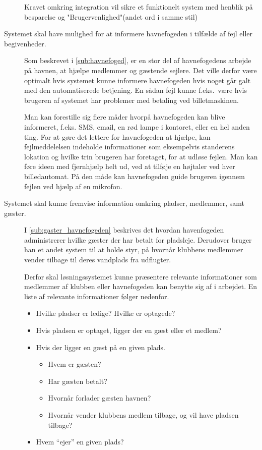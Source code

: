 \begin{description}
Kravet omkring integration vil sikre et funktionelt system med henblik på besparelse og "Brugervenlighed"(andet ord i samme stil)

  \item[Systemet skal have mulighed for at informere havnefogeden i tilfælde af fejl eller begivenheder.]

  Som beskrevet i \cref{sub:havnefoged}, er en stor del af havnefogedens arbejde på havnen, at hjælpe medlemmer og gæstende sejlere. Det ville derfor være optimalt hvis systemet kunne informere havnefogeden hvis noget går galt med den automatiserede betjening. En sådan fejl kunne f.eks.\ være hvis brugeren af systemet har problemer med betaling ved billetmaskinen.

  Man kan forestille sig flere måder hvorpå havnefogeden kan blive informeret, f.eks. SMS, email, en rød lampe i kontoret, eller en hel anden ting. For at gøre det lettere for havnefogeden at hjælpe, kan fejlmeddelelsen indeholde informationer som eksempelvis standerens lokation og hvilke trin brugeren har foretaget, for at udløse fejlen. Man kan føre ideen med fjernhjælp helt ud, ved at tilføje en højtaler ved hver billedautomat. På den måde kan havnefogeden guide brugeren igennem fejlen ved hjælp af en mikrofon.


  \item[Systemet skal kunne fremvise information omkring pladser, medlemmer, samt gæster.]

  I \cref{sub:gaster_havnefogeden} beskrives det hvordan havenfogeden administrerer hvilke gæster der har betalt for pladsleje. Derudover bruger han et andet system til at holde styr, på hvornår klubbens medlemmer vender tilbage til deres vandplads fra udflugter.

  Derfor skal løsningssystemet kunne præsentere relevante informationer som medlemmer af klubben eller havnefogeden kan benytte sig af i arbejdet. En liste af relevante informationer følger nedenfor.





  \begin{itemize}
  \item Hvilke pladser er ledige? Hvilke er optagede?
  \item Hvis pladsen er optaget, ligger der en gæst eller et medlem?
  \item Hvis der ligger en gæst på en given plads.
    \begin{itemize}
      \item Hvem er gæsten?
      \item Har gæsten betalt?
      \item Hvornår forlader gæsten havnen?
      \item Hvornår vender klubbens medlem tilbage, og vil have pladsen tilbage?
    \end{itemize}
  \item Hvem \enquote{ejer} en given plads?
  \end{itemize}


\end{description}
